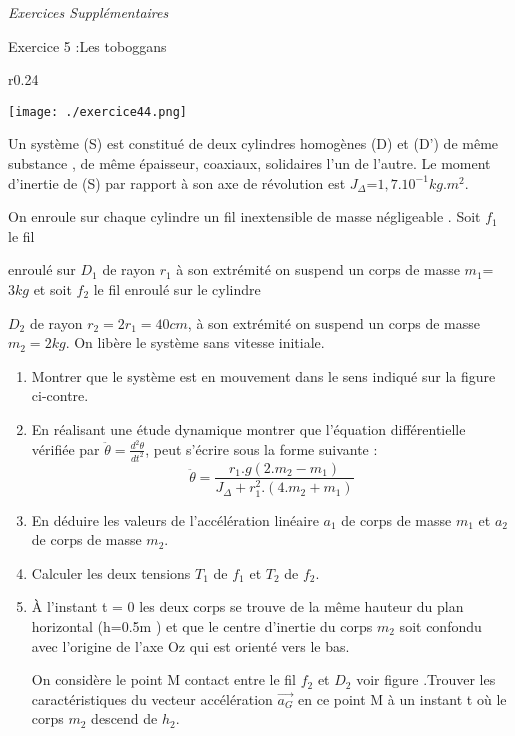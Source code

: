 \documentclass[12pt, french]{article}
\begin{document}
\begin{center}
   \Large{ \em{Exercices Supplémentaires}}
\end{center}


\begin{Box2}{Exercice 5 :Les toboggans}

  \begin{wrapfigure}[8]{r}{0.24\textwidth}
  \vspace{-1cm}
  \begin{center}
    \texttt{[image: ./exercice44.png]}
  \end{center}
\end{wrapfigure}
Un système (S) est constitué de deux cylindres homogènes (D) et (D’) de même substance , de même épaisseur, coaxiaux,
solidaires l’un de l’autre. Le moment d’inertie
de (S) par rapport à son axe de révolution
  est $J_{\Delta} $=$ 1,7.10^{-1}kg.m^2$.

On enroule sur chaque cylindre un fil inextensible de masse négligeable . Soit $f_1$ le fil

enroulé sur $D_1$ de rayon $r_1$ à son extrémité
on suspend un corps de masse $m_1 $=$ 3kg$
et soit $f_2$ le fil enroulé sur le cylindre

$D_2$ de rayon $r_2 = 2r_1 = 40cm$, à son extrémité on suspend un corps de masse $m_2 = 2kg$.
On libère le système sans vitesse initiale.


\begin{enumerate}
  \item Montrer que le système est en mouvement dans le sens indiqué sur la figure ci-contre.
  \item En réalisant une étude dynamique montrer que l’équation différentielle vérifiée par $\ddot{\theta} = \frac{d^2\theta}{dt^2}$, peut s’écrire sous la forme suivante : $$\ddot{\theta} = \frac{r_1.g(2.m_2 - m_1)}{J_{\Delta} + r_1^2.(4.m_2 + m_1)}$$
  \item En déduire les valeurs de l’accélération linéaire $a_1$ de corps de masse $m_1$ et $a_2$ de corps de masse $m_2$.
  \item Calculer les deux tensions $T_1$ de $f_1$ et $T_2$ de $f_2$.
  \item À l’instant t = 0 les deux corps se trouve de la même hauteur du plan horizontal
    (h=0.5m ) et que le centre d’inertie du corps $m_2$ soit confondu avec l’origine de l’axe
Oz qui est orienté vers le bas.

On considère le point M contact entre le fil $f_2$ et $D_2$ voir figure .Trouver les caractéristiques du vecteur accélération $\vec{a_G}$ en ce point M à un instant t où le corps $m_2$ descend de $h_2$.

\end{enumerate}

\end{Box2}
\end{document}
